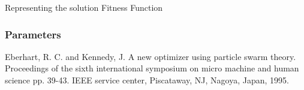 \documentclass[runningheads,a4paper]{llncs}
\begin{document}
Representing the solution
Fitness Function

\subsubsection{Parameters}

\begin{thebibliography}{9}
Eberhart, R. C. and Kennedy, J. A new optimizer using particle swarm theory. Proceedings of the sixth international symposium on micro machine and human science pp. 39-43. IEEE service center, Piscataway, NJ, Nagoya, Japan, 1995.

 

\end{thebibliography}
\end{document}
